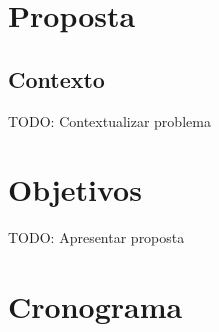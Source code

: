 \chapter{Proposta}
\section{Contexto}
\label{pr:contex}
TODO: Contextualizar problema

\newpage
\chapter{Objetivos}
\label{pr:objectives}
TODO: Apresentar proposta

\newpage
\chapter{Cronograma}
\label{pr:chrono}
